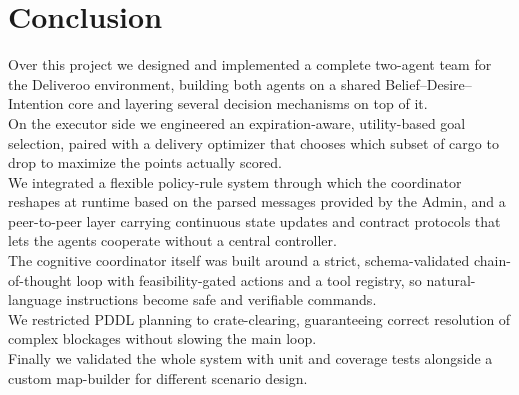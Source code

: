 \chapter{Conclusion}
\label{ch:conclusion}

Over this project we designed and implemented a complete two-agent team for the Deliveroo environment, 
building both agents on a shared Belief–Desire–Intention core and layering several decision mechanisms on top of it.\\ 
On the executor side we engineered an expiration-aware, utility-based goal selection, paired with a delivery optimizer 
that chooses which subset of cargo to drop to maximize the points actually scored.\\ 
We integrated a flexible policy-rule system through which the coordinator reshapes at runtime 
based on the parsed messages provided by the Admin, and a peer-to-peer layer carrying continuous state updates and contract protocols 
that lets the agents cooperate without a central controller.\\ 
The cognitive coordinator itself was built around a strict, schema-validated chain-of-thought 
loop with feasibility-gated actions and a tool registry, so natural-language instructions become safe 
and verifiable commands. \\
We restricted PDDL planning to crate-clearing, guaranteeing correct resolution of complex blockages without 
slowing the main loop.\\
Finally we validated the whole system with unit and coverage tests alongside a custom map-builder 
for different scenario design.